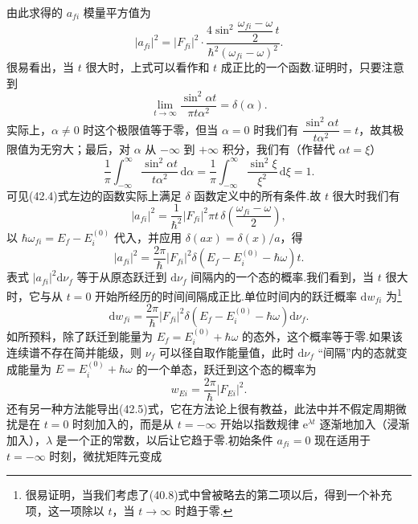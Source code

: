 由此求得的 $a_{fi}$ 模量平方值为
\begin{equation}
  |a_{fi}|^2=|F_{fi}|^2\cdot
  \frac{4\sin^2\dfrac{\omega_{fi}-\omega}{2}\,t}{\hbar^2\left(\omega_{fi}-\omega\right)^2}.
\end{equation}
很易看出，当 $t$ 很大时，上式可以看作和 $t$ 成正比的一个函数.证明时，只要注意到
\begin{equation}
  \lim_{t\to\infty}\frac{\sin^2\alpha t}{\pi t\alpha^2}=\delta(\alpha).
\end{equation}
实际上，$\alpha\neq0$ 时这个极限值等于零，但当 $\alpha=0$ 时我们有
$\dfrac{\sin^2\alpha t}{t\alpha^2}=t$，故其极限值为无穷大；最后，对 $\alpha$ 从 $-\infty$ 到 $+\infty$ 积分，我们有（作替代 $\alpha t=\xi$）
\begin{equation*}
  \frac{1}{\pi}\int_{-\infty}^{\infty}\frac{\sin^2\alpha t}{t\alpha^2}\,\mathrm{d}\alpha
  =\frac{1}{\pi}\int_{-\infty}^{\infty}\frac{\sin^2\xi}{\xi^2}\,\mathrm{d}\xi=1.
\end{equation*}
可见(42.4)式左边的函数实际上满足 $\delta$ 函数定义中的所有条件.故 $t$ 很大时我们有
\begin{equation*}
  |a_{fi}|^2=\frac{1}{\hbar^2}|F_{fi}|^2\pi t\,
  \delta\left(\frac{\omega_{fi}-\omega}{2}\right),
\end{equation*}
以 $\hbar\omega_{fi}=E_f-E_i^{(0)}$ 代入，并应用 $\delta(ax)=\delta(x)/a$，得
\begin{equation*}
  |a_{fi}|^2=\frac{2\pi}{\hbar}|F_{fi}|^2
  \delta\left(E_f-E_i^{(0)}-\hbar\omega\right)t.
\end{equation*}
表式 $|a_{fi}|^2\mathrm{d}\nu_f$ 等于从原态跃迁到 $\mathrm{d}\nu_f$ 间隔内的一个态的概率.我们看到，当 $t$ 很大时，它与从 $t=0$ 开始所经历的时间间隔成正比.单位时间内的跃迁概率 $\mathrm{d}w_{fi}$ 为\footnote{很易证明，当我们考虑了(40.8)式中曾被略去的第二项以后，得到一个补充项，这一项除以 $t$，当 $t\to\infty$ 时趋于零.}
\begin{equation}
  \mathrm{d}w_{fi}=\frac{2\pi}{\hbar}|F_{fi}|^2
  \delta\left(E_f-E_i^{(0)}-\hbar\omega\right)\mathrm{d}\nu_f.
\end{equation}
如所预料，除了跃迁到能量为 $E_f=E_i^{(0)}+\hbar\omega$ 的态外，这个概率等于零.如果该连续谱不存在简并能级，则 $\nu_f$ 可以径自取作能量值，此时 $\mathrm{d}\nu_f$ “间隔”内的态就变成能量为 $E=E_i^{(0)}+\hbar\omega$ 的一个单态，跃迁到这个态的概率为
\begin{equation}
  w_{Ei}=\frac{2\pi}{\hbar}|F_{Ei}|^2.
\end{equation}
还有另一种方法能导出(42.5)式，它在方法论上很有教益，此法中并不假定周期微扰是在 $t=0$ 时刻加入的，而是从 $t=-\infty$ 开始以指数规律 $\mathrm{e}^{\lambda t}$ 逐渐地加入（浸渐加入），$\lambda$ 是一个正的常数，以后让它趋于零.初始条件 $a_{fi}=0$ 现在适用于 $t=-\infty$ 时刻，微扰矩阵元变成
